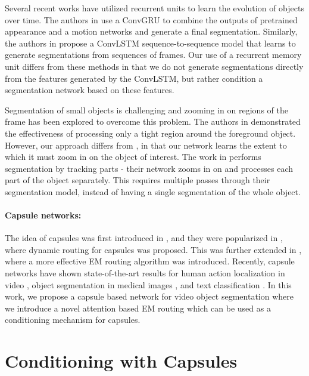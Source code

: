\documentclass[10pt,twocolumn,letterpaper]{article}
\begin{document}
Several recent works have utilized recurrent units to learn the evolution of objects over time. The authors in \cite{tokmakov2017learning}  use a ConvGRU to combine the outputs of pretrained appearance and a motion networks and generate a final segmentation. Similarly, the authors in \cite{xu2018youtube} propose a ConvLSTM sequence-to-sequence model that learns to generate segmentations from sequences of frames. Our use of a recurrent memory unit  differs from these methods in that we do not generate segmentations directly from the features generated by the ConvLSTM,  but rather condition a segmentation network based on these features. 

Segmentation of small objects is challenging and zooming in on regions of the frame has been explored to overcome this problem. The authors in  \cite{ci2018video} demonstrated the effectiveness of processing only a tight region around the foreground object. However, our approach differs from \cite{ci2018video}, in that our network learns the extent to which it must zoom in on the object of interest. The work in \cite{cheng2018fast} performs segmentation by tracking parts - their network zooms in on and processes each part of the object separately. This requires multiple passes through their segmentation model, instead of having a single segmentation of the whole object.

\paragraph{Capsule networks:} 
The idea of capsules was first introduced in \cite{hinton2011transforming}, and they were popularized in \cite{sabour2017dynamic}, where dynamic routing for capsules was proposed. This was further extended in \cite{hinton2018matrix}, where a more effective EM routing algorithm was introduced. Recently, capsule networks have shown state-of-the-art results for human action localization in video \cite{duarte2018videocapsulenet}, object segmentation in medical images \cite{lalonde2018capsules}, and text classification \cite{zhao2018investigating}. In this work, we propose a capsule based network for video object segmentation where we introduce a novel attention based EM routing which can be used as a conditioning mechanism for capsules. 



\section{Conditioning with Capsules} \label{section:conditioning}
\end{document}
